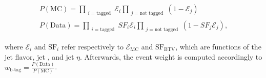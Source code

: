 \begin{itemize}
    \begin{linenomath*}
    \begin{align}
    P(\text{MC}) = \prod_{\substack{i=\text{tagged}}} \mathcal{E}_i \prod_{\substack{j=\text{not tagged}}} (1 - \mathcal{E}_j) \\
    P(\text{Data}) = \prod_{\substack{i=\text{tagged}}} SF_i\mathcal{E}_i \prod_{\substack{j=\text{not tagged}}} (1 - SF_j\mathcal{E}_j),
    \end{align}
    \end{linenomath*}
    where $\mathcal{E}_i$ and $ \text{SF}_i $ refer respectively to $\mathcal{E}_{\text{MC}}$ and $\text{SF}_{\text{BTV}}$, which are functions of the jet flavor, jet \pT, and jet $\eta$. 
    Afterwards, the event weight is computed accordingly to $w_{\text{b-tag}} = \frac{P(\text{Data})}{P(\text{MC})}$.
    

\end{itemize}
